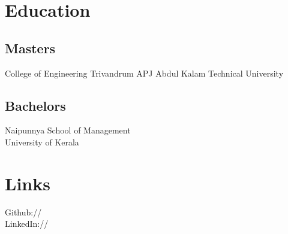 \documentclass[]{resume_karuvally_openfont}
\begin{document}
%
%
\lastupdated

%
%



%
%

\begin{minipage}[t]{0.33\textwidth} 


\section{Education} 

\subsection{Masters}
College of Engineering Trivandrum
APJ Abdul Kalam Technical University
\sectionsep

\subsection{Bachelors}
Naipunnya School of Management \\
University of Kerala \\
\sectionsep


\section{Links} 
Github:// \href{https://github.com/karuvally}{} \\
LinkedIn://  \href{https://www.linkedin.com/in/karuvally}{} \\
\sectionsep



\end{minipage}
\end{document}
